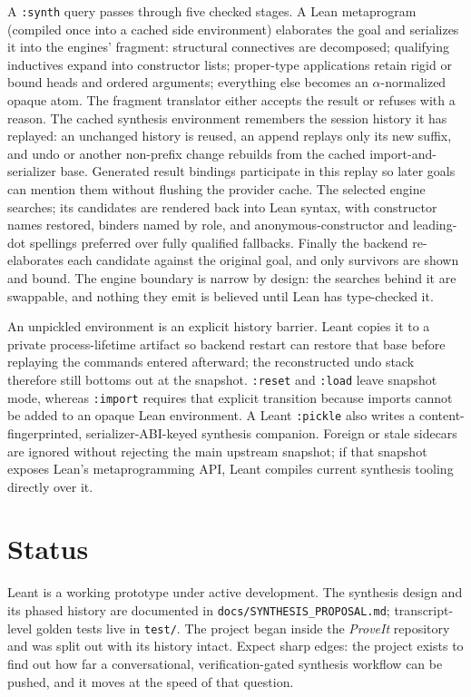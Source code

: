 \documentclass[11pt,oneside]{article}
\newcommand{\code}[1]{\texttt{#1}}
\begin{document}
A \code{:synth} query passes through five checked stages. A Lean
metaprogram (compiled once into a cached side environment) elaborates
the goal and serializes it into the engines' fragment: structural
connectives are decomposed; qualifying inductives expand into
constructor lists; proper-type applications retain rigid or bound heads
and ordered arguments; everything else becomes an $\alpha$-normalized
opaque atom. The fragment translator either accepts the result or
refuses with a reason. The cached synthesis environment remembers the
session history it has replayed: an unchanged history is reused, an
append replays only its new suffix, and undo or another non-prefix
change rebuilds from the cached import-and-serializer base. Generated
result bindings participate in this replay so later goals can mention
them without flushing the provider cache. The selected engine searches;
its candidates are rendered back into Lean syntax, with constructor
names restored, binders named by role, and anonymous-constructor and
leading-dot spellings preferred over fully qualified fallbacks. Finally the
backend re-elaborates each candidate against the original goal, and
only survivors are shown and bound. The engine boundary is narrow by
design: the searches behind it are swappable, and nothing they emit is
believed until Lean has type-checked it.

An unpickled environment is an explicit history barrier. Leant copies it to
a private process-lifetime artifact so backend restart can restore that base
before replaying the commands entered afterward; the reconstructed undo stack
therefore still bottoms out at the snapshot. \code{:reset} and \code{:load}
leave snapshot mode, whereas \code{:import} requires that explicit transition
because imports cannot be added to an opaque Lean environment. A Leant
\code{:pickle} also writes a content-fingerprinted, serializer-ABI-keyed
synthesis companion. Foreign or stale sidecars are ignored without rejecting
the main upstream snapshot; if that snapshot exposes Lean's metaprogramming
API, Leant compiles current synthesis tooling directly over it.

\section{Status}\label{sec:status}

Leant is a working prototype under active development.
The synthesis design and its phased history are documented in
\code{docs/SYNTHESIS\_PROPOSAL.md}; transcript-level golden tests live in
\code{test/}. The project began inside the \emph{ProveIt} repository
and was split out with its history intact. Expect sharp edges: the project exists to find out how far a
conversational, verification-gated synthesis workflow can be pushed,
and it moves at the speed of that question.
\end{document}
